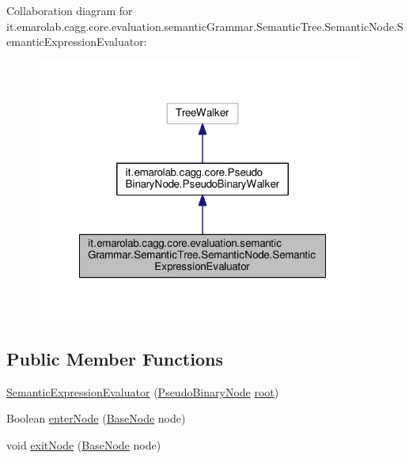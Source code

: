 Collaboration diagram for it.\-emarolab.\-cagg.\-core.\-evaluation.\-semantic\-Grammar.\-Semantic\-Tree.\-Semantic\-Node.\-Semantic\-Expression\-Evaluator\-:\nopagebreak
\begin{figure}[H]
\begin{center}
\leavevmode
\includegraphics[width=312pt]{classit_1_1emarolab_1_1cagg_1_1core_1_1evaluation_1_1semanticGrammar_1_1SemanticTree_1_1Semanticd6bb3095db01a7a47aa4fc3e2c533929}
\end{center}
\end{figure}
\subsection*{Public Member Functions}
\begin{DoxyCompactItemize}
\item 
\hyperlink{classit_1_1emarolab_1_1cagg_1_1core_1_1evaluation_1_1semanticGrammar_1_1SemanticTree_1_1Semantic4c3f840cd671383fb305cb0305b7229f_a6f71c4ce109af8e56ec1fa8e3e5b2b0b}{Semantic\-Expression\-Evaluator} (\hyperlink{classit_1_1emarolab_1_1cagg_1_1core_1_1PseudoBinaryNode}{Pseudo\-Binary\-Node} \hyperlink{classit_1_1emarolab_1_1cagg_1_1core_1_1evaluation_1_1semanticGrammar_1_1SemanticTree_ab30b5997c372c3fe036d719a430d206e}{root})
\item 
Boolean \hyperlink{classit_1_1emarolab_1_1cagg_1_1core_1_1evaluation_1_1semanticGrammar_1_1SemanticTree_1_1Semantic4c3f840cd671383fb305cb0305b7229f_ade2de57355c38a9f1d0de835f4fc8f25}{enter\-Node} (\hyperlink{classit_1_1emarolab_1_1cagg_1_1core_1_1BaseNode}{Base\-Node} node)
\item 
void \hyperlink{classit_1_1emarolab_1_1cagg_1_1core_1_1evaluation_1_1semanticGrammar_1_1SemanticTree_1_1Semantic4c3f840cd671383fb305cb0305b7229f_a8a06bee7c86976dc63af33f38e701ec2}{exit\-Node} (\hyperlink{classit_1_1emarolab_1_1cagg_1_1core_1_1BaseNode}{Base\-Node} node)
\end{DoxyCompactItemize}
